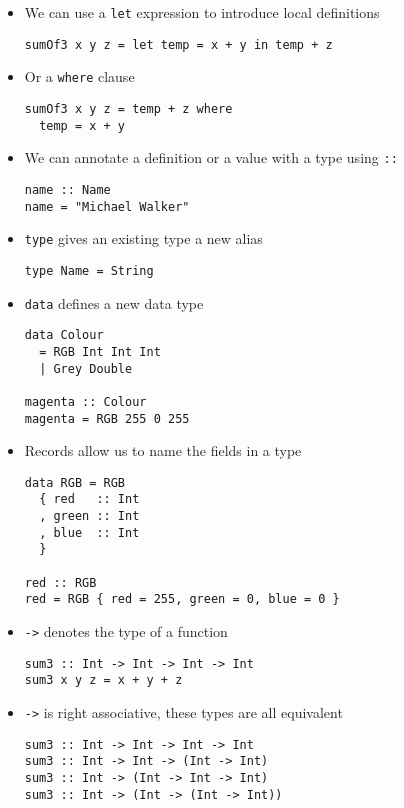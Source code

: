 \begin{itemize}
\item We can use a \verb|let| expression to introduce local definitions
\begin{verbatim}
sumOf3 x y z = let temp = x + y in temp + z
\end{verbatim}

\item Or a \verb|where| clause
\begin{verbatim}
sumOf3 x y z = temp + z where
  temp = x + y
\end{verbatim}

\item We can annotate a definition or a value with a type using \verb|::|
\begin{verbatim}
name :: Name
name = "Michael Walker"
\end{verbatim}

\item \verb|type| gives an existing type a new alias
\begin{verbatim}
type Name = String
\end{verbatim}

\item \verb|data| defines a new data type
\begin{verbatim}
data Colour
  = RGB Int Int Int
  | Grey Double

magenta :: Colour
magenta = RGB 255 0 255
\end{verbatim}

\item Records allow us to name the fields in a type
\begin{verbatim}
data RGB = RGB
  { red   :: Int
  , green :: Int
  , blue  :: Int
  }

red :: RGB
red = RGB { red = 255, green = 0, blue = 0 }
\end{verbatim}

\item \verb|->| denotes the type of a function
\begin{verbatim}
sum3 :: Int -> Int -> Int -> Int
sum3 x y z = x + y + z
\end{verbatim}

\pagebreak
\item \verb|->| is right associative, these types are all equivalent
\begin{verbatim}
sum3 :: Int -> Int -> Int -> Int
sum3 :: Int -> Int -> (Int -> Int)
sum3 :: Int -> (Int -> Int -> Int)
sum3 :: Int -> (Int -> (Int -> Int))
\end{verbatim}


\end{itemize}
